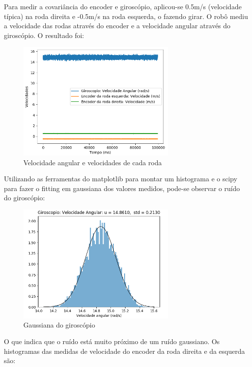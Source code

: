 \documentclass[
	12pt,				%
	openright,			%
	twoside,			%
	convert,
	a4paper,			%
	english,			%
	french,				%
	spanish,			%
	brazil				%
	]{abntex2}
\begin{document}
Para medir a covariância do encoder e giroscópio, aplicou-se 0.5m/s (velocidade típica) na roda direita e -0.5m/s na roda esquerda, o fazendo girar. O robô mediu a velocidade das rodas através do encoder e a velocidade angular através do giroscópio. O resultado foi:
\begin{figure}[H]
	\caption{Velocidade angular e velocidades de cada roda}
\begin{center}
   \includegraphics[width=0.7\textwidth]{cov_gyro_enc}
\end{center}
\end{figure}
Utilizando as ferramentas do matplotlib \cite{matplotlib} para montar um histograma e o scipy \cite{scipy} para fazer o fitting em gaussiana dos valores medidos, pode-se observar o ruído do giroscópio:
\begin{figure}[H]
	\caption{Gaussiana do giroscópio}
\begin{center}
   \includegraphics[width=0.7\textwidth]{gyro_gaussiana}
\end{center}
\end{figure}
O que indica que o ruído está muito próximo de um ruído gaussiano. Os histogramas das medidas de velocidade do encoder da roda direita e da esquerda são:
\end{document}
